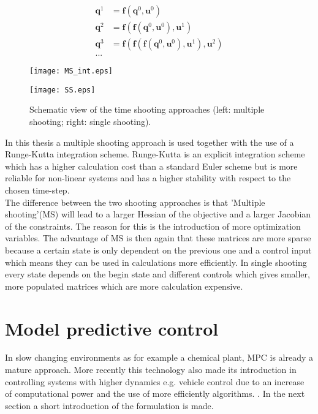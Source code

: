 \begin{enumerate}
	\begin{equation}\label{eq:2}
	\begin{aligned}
	\bm{q}^1 &= \bm{f}(\bm{q}^0, \bm{u}^0)\\
	\bm{q}^2 &= \bm{f}(\bm{f}(\bm{q}^0, \bm{u}^0), \bm{u}^1)\\
	\bm{q}^3 &= \bm{f}(\bm{f}(\bm{f}(\bm{q}^0, \bm{u}^0), \bm{u}^1), \bm{u}^2)\\
	...
	\end{aligned}
	\end{equation}
\end{enumerate}

\begin{figure}[htp]
	\centering
	\begin{minipage}{0.49\textwidth}
		\centering
		\texttt{[image: MS\_int.eps]}
	\end{minipage}
	\hfill
	\begin{minipage}{.49\textwidth}
		\centering
		\texttt{[image: SS.eps]}
	\end{minipage}
	\caption{Schematic view of the time shooting approaches (left: multiple shooting; right: single shooting).}
	\label{fig:TS}
\end{figure}

In this thesis a multiple shooting approach is used together with the use of a Runge-Kutta integration scheme. Runge-Kutta is an explicit integration scheme which has a higher calculation cost than a standard Euler scheme but is more reliable for non-linear systems and has a higher stability with respect to the chosen time-step. \cite{Mercy2018}  \\ 

The difference between the two shooting approaches is that 'Multiple shooting'(MS) will lead to a larger Hessian of the objective and a larger Jacobian of the constraints. The reason for this is the introduction of more optimization variables. The advantage of MS is then again that these matrices are more sparse because a certain state is only dependent on the previous one and a control input which means they can be used in calculations more efficiently. In single shooting every state depends on the begin state and different controls which gives smaller, more populated matrices which are more calculation expensive. \cite{Gillis2019}

\section{Model predictive control}
\label{s:MPC_e}
In slow changing environments as for example a chemical plant, MPC is already a mature approach. More recently this technology also made its introduction in controlling systems with higher dynamics e.g. vehicle control due to an increase of computational power and the use of more efficiently algorithms. \cite{Mercy2018}. In the next section a short introduction of the formulation is made. \\

